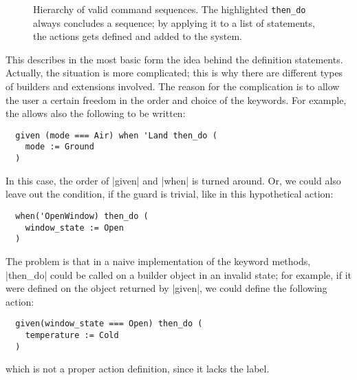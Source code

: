 \begin{figure}
  \centering
  \caption{Hierarchy of valid command sequences. The highlighted \lstinline|then_do| always
    concludes a sequence; by applying it to a list of statements, the actions gets defined and 
    added to the system. 
    \label{fig:commands}}
\end{figure}

This describes in the most basic form the idea behind the definition statements. Actually, the
situation is more complicated; this is why there are different types of builders and extensions
involved. The reason for the complication is to allow the user a certain freedom in the order and
choice of the keywords. For example, the \dsl{} allows also the following to be written:
\begin{lstlisting}
  given (mode === Air) when 'Land then_do (
    mode := Ground
  )
\end{lstlisting}
In this case, the order of |given| and |when| is turned around. Or, we could also leave out the
condition, if the guard is trivial, like in this hypothetical action:
\begin{lstlisting}
  when('OpenWindow) then_do (
    window_state := Open
  )
\end{lstlisting}
The problem is that in a naive implementation of the keyword methods, |then_do| could be called on a
builder object in an invalid state; for example, if it were defined on the object returned by
|given|, we could define the following action:
\begin{lstlisting}
  given(window_state === Open) then_do (
    temperature := Cold
  )
\end{lstlisting}
which is not a proper action definition, since it lacks the label. 

